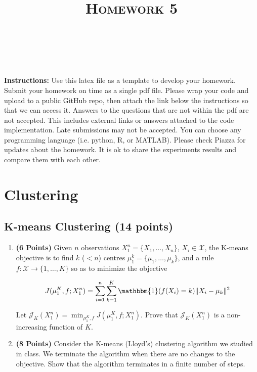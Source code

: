 \documentclass[a4paper]{article}
\title{\textsc{Homework 5}} %
\author{
\red{$>>$Nevindu M. Batagoda$<<$} \\
\red{$>>$9081677594$<<$}\\
}
\date{}
\newcounter{thm}
\newcommand{\Xcal}{\mathcal{X}}
\newcommand{\Jcal}{\mathcal{J}}
\newcommand{\indfone}{\mathbbm{1}}
\theoremstyle{definition}
\begin{document}
\maketitle 


\textbf{Instructions:}
Use this latex file as a template to develop your homework. Submit your homework on time as a single pdf file. Please wrap your code and upload to a public GitHub repo, then attach the link below the instructions so that we can access it. Answers to the questions that are not within the pdf are not accepted. This includes external links or answers attached to the code implementation. Late submissions may not be accepted. You can choose any programming language (i.e. python, R, or MATLAB). Please check Piazza for updates about the homework. It is ok to share the experiments results and compare them with each other.

\vspace{0.1in}


\section{Clustering}

\subsection{K-means Clustering (14 points)}

\begin{enumerate}

\item \textbf{(6 Points)}
Given $n$ observations $X_1^n = \{X_1, \dots, X_n\}$, $X_i \in \Xcal$, the K-means objective
is to find $k$
($<n$) centres $\mu_1^k = \{\mu_1, \dots, \mu_k\}$, and a rule $f:\Xcal \rightarrow
\{1,\dots, K\}$ so as to minimize the objective

\begin{equation}
J(\mu_1^K, f; X_1^n) = \sum_{i=1}^n \sum_{k=1}^K \indfone(f(X_i) = k) \|X_i - \mu_k\|^2
\label{eqn:kmeans}
\end{equation}

Let $\Jcal_K(X_1^n) = \min_{\mu_1^K, f} J(\mu_1^K, f; X_1^n)$. Prove that
$\Jcal_{K}(X_1^n)$ is a non-increasing function of $K$.

\item \textbf{(8 Points)}
Consider the K-means (Lloyd's) clustering algorithm we studied in class. We
terminate the algorithm when there are no changes to the objective.
Show that the algorithm terminates in a finite number of steps.

\end{enumerate}
\end{document}
